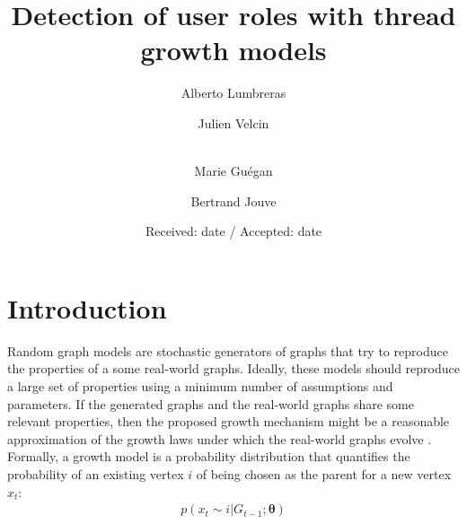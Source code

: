 \documentclass[smallextended]{svjour3}          %
\begin{document}
\title{Detection of user roles with thread growth models}

\author{Alberto Lumbreras \and
        Julien Velcin  \and\\
        Marie Guégan \and
        Bertrand Jouve
}



\date{Received: date / Accepted: date}

\maketitle


\section{Introduction}
Random graph models are stochastic generators of graphs that try to reproduce the properties of a some real-world graphs. Ideally, these models should reproduce a large set of properties using a minimum number of assumptions and parameters. If the generated graphs and the real-world graphs share some relevant properties, then the proposed growth mechanism might be a reasonable approximation of the growth laws under which the real-world graphs evolve \citep{Kolaczyk2009}. Formally, a growth model is a probability distribution that quantifies the probability of an existing vertex $i$ of being chosen as the parent for a new vertex $x_t$:
\begin{align*}
p(x_t \sim i | G_{t-1}; \boldsymbol{\theta})
\label{eq:growth_model}
\end{align*} 
\end{document}
